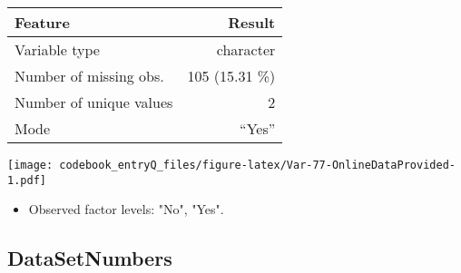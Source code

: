 \documentclass[]{article}
\providecommand{\tightlist}{%
  \setlength{\itemsep}{0pt}\setlength{\parskip}{0pt}}
\newcommand{\fullline}{\noindent\makebox[\linewidth]{\rule{\textwidth}{0.4pt}}}
\newcommand{\bminione}{\begin{minipage}{0.75 \textwidth}}
\newcommand{\bminitwo}{\begin{minipage}{0.25 \textwidth}}
\newcommand{\emini}{\end{minipage}}
\begin{document}
\bminione

\begin{longtable}[]{@{}lr@{}}
\toprule
\begin{minipage}[b]{0.34\columnwidth}\raggedright\strut
Feature\strut
\end{minipage} & \begin{minipage}[b]{0.20\columnwidth}\raggedleft\strut
Result\strut
\end{minipage}\tabularnewline
\midrule
\endhead
\begin{minipage}[t]{0.34\columnwidth}\raggedright\strut
Variable type\strut
\end{minipage} & \begin{minipage}[t]{0.20\columnwidth}\raggedleft\strut
character\strut
\end{minipage}\tabularnewline
\begin{minipage}[t]{0.34\columnwidth}\raggedright\strut
Number of missing obs.\strut
\end{minipage} & \begin{minipage}[t]{0.20\columnwidth}\raggedleft\strut
105 (15.31 \%)\strut
\end{minipage}\tabularnewline
\begin{minipage}[t]{0.34\columnwidth}\raggedright\strut
Number of unique values\strut
\end{minipage} & \begin{minipage}[t]{0.20\columnwidth}\raggedleft\strut
2\strut
\end{minipage}\tabularnewline
\begin{minipage}[t]{0.34\columnwidth}\raggedright\strut
Mode\strut
\end{minipage} & \begin{minipage}[t]{0.20\columnwidth}\raggedleft\strut
``Yes''\strut
\end{minipage}\tabularnewline
\bottomrule
\end{longtable}

\emini
\bminitwo
\texttt{[image: codebook\_entryQ\_files/figure-latex/Var-77-OnlineDataProvided-1.pdf]}
\emini

\begin{itemize}
\tightlist
\item
  Observed factor levels: "No", "Yes".
\end{itemize}

\fullline

\hypertarget{datasetnumbers}{\subsection{DataSetNumbers}\label{datasetnumbers}}
\end{document}
